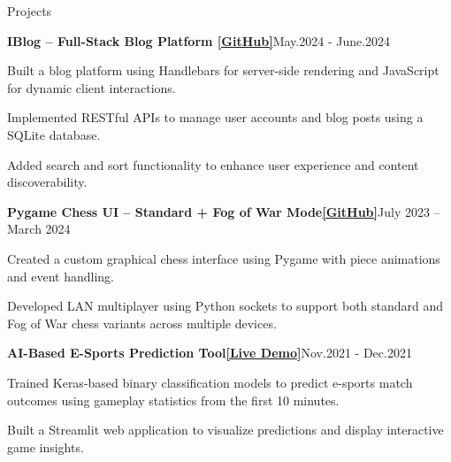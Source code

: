 \documentclass{resume} %
\begin{document}
	\begin{rSection}{Projects}
        \begin{rSubsection}{\bf IBlog – Full-Stack Blog Platform \href{https://github.com/JaekeeAI/ecs162finalproject}{[GitHub]}}{May.2024 - June.2024}{}{}
             \item{Built a blog platform using Handlebars for server-side rendering and JavaScript for dynamic client interactions.}
             \item{Implemented RESTful APIs to manage user accounts and blog posts using a SQLite database.}
             \item{Added search and sort functionality to enhance user experience and content discoverability.}
        \end{rSubsection}
            
        \begin{rSubsection}{\bf Pygame Chess UI – Standard + Fog of War Mode\href{https://github.com/wsxxs2222/chess_game}{[GitHub]}}{July 2023 -- March 2024}{}{ }
            \item{Created a custom graphical chess interface using Pygame with piece animations and event handling.}
            \item{Developed LAN multiplayer using Python sockets to support both standard and Fog of War chess variants across multiple devices.}
        \end{rSubsection}
    
        \begin{rSubsection}{\bf AI-Based E-Sports Prediction Tool\href{https://math10finalproject-k63yumzsdperqx7hdd2pww.streamlit.app/}{[Live Demo]}}{Nov.2021 - Dec.2021}{}{}
            \item {Trained Keras-based binary classification models to predict e-sports match outcomes using gameplay statistics from the first 10 minutes.}
            \item{Built a Streamlit web application to visualize predictions and display interactive game insights.}
        \end{rSubsection}
    \end{rSection}
	
\end{document}
